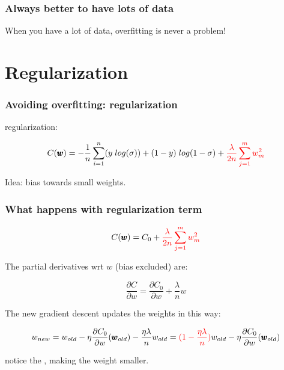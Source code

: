 \documentclass[usenames,dvipsnames]{beamer}
\begin{document}

\begin{frame}
  \frametitle{Always better to have lots of data}
  
  \begin{ntblock}
  	\centering
  	When you have a lot of data, overfitting is never a problem!
  \end{ntblock}
  
\end{frame}



\section{Regularization}


\begin{frame}
  \frametitle{Avoiding overfitting: regularization}
  
   regularization:
  
\[ C(\pmb{w}) = -\frac{1}{n} \sum_{i=1}^{n} (y \; log(\sigma)) + (1-y) \; log(1 - \sigma) + \tc{red}{\frac{\lambda}{2n} \sum_{j=1}^{m} w_m^2} \]


\begin{alertblock}{Idea:}
\centering
	bias towards small weights.
\end{alertblock}
\end{frame}


\begin{frame}
  \frametitle{What happens with regularization term}
  
  \[ C(\pmb{w}) = C_0 + \tc{red}{\frac{\lambda}{2n} \sum_{j=1}^{m} w_m^2} \]
  
  
  The partial derivatives wrt $w$ (bias excluded) are:
  
\[
\frac{\partial C}{\partial w} = \frac{\partial C_0}{\partial w} + \frac{\lambda}{n}w
\]


The new gradient descent updates the weights in this way:


\[ w_{new} = w_{old} -\eta \frac{\partial C_0}{\partial w}(\pmb{w}_{old}) - \frac{\eta \lambda}{n} w_{old} = \tc{red}{(1 - \frac{\eta \lambda}{n})}w_{old} -\eta \frac{\partial C_0}{\partial w}(\pmb{w}_{old}) \]

  notice the , making the weight smaller.
  
\end{frame}
\end{document}
